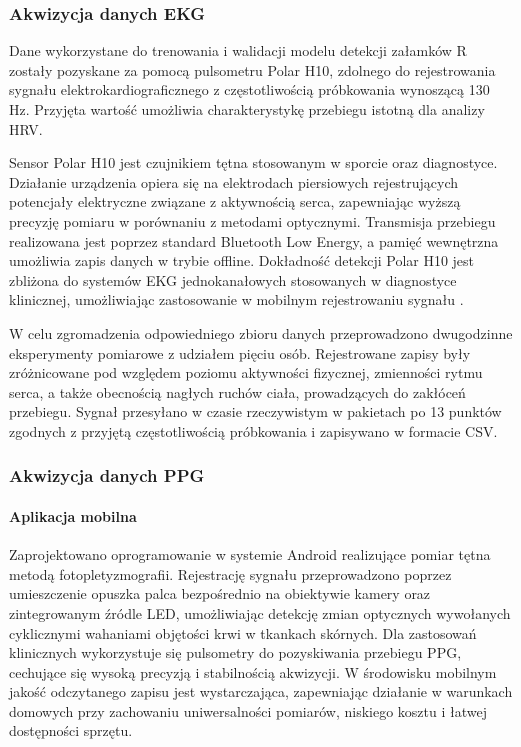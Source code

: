\documentclass[journal]{IEEEtran}
\begin{document}
\subsubsection{Akwizycja danych EKG}
Dane wykorzystane do trenowania i walidacji modelu detekcji załamków R zostały pozyskane za pomocą pulsometru Polar H10, zdolnego do rejestrowania sygnału elektrokardiograficznego z częstotliwością próbkowania wynoszącą 130 Hz. Przyjęta wartość umożliwia charakterystykę przebiegu istotną dla analizy HRV.

Sensor Polar H10 jest czujnikiem tętna stosowanym w sporcie oraz diagnostyce. Działanie urządzenia opiera się na elektrodach piersiowych rejestrujących potencjały elektryczne związane z aktywnością serca, zapewniając wyższą precyzję pomiaru w porównaniu z metodami optycznymi. Transmisja przebiegu realizowana jest poprzez standard Bluetooth Low Energy, a pamięć wewnętrzna umożliwia zapis danych w trybie offline. Dokładność detekcji Polar H10 jest zbliżona do systemów EKG jednokanałowych stosowanych w diagnostyce klinicznej, umożliwiając zastosowanie w mobilnym rejestrowaniu sygnału \cite{15}.

W celu zgromadzenia odpowiedniego zbioru danych przeprowadzono dwugodzinne eksperymenty pomiarowe z udziałem pięciu osób. Rejestrowane zapisy były zróżnicowane pod względem poziomu aktywności fizycznej, zmienności rytmu serca, a także obecnością nagłych ruchów ciała, prowadzących do zakłóceń przebiegu. Sygnał przesyłano w czasie rzeczywistym w pakietach po 13 punktów zgodnych z przyjętą częstotliwością próbkowania i zapisywano w formacie CSV. 


\subsubsection{Akwizycja danych PPG}
\paragraph{Aplikacja mobilna}
Zaprojektowano oprogramowanie w systemie Android realizujące pomiar tętna metodą fotopletyzmografii. Rejestrację sygnału przeprowadzono poprzez umieszczenie opuszka palca bezpośrednio na obiektywie kamery oraz zintegrowanym źródle LED, umożliwiając detekcję zmian optycznych wywołanych cyklicznymi wahaniami objętości krwi w tkankach skórnych. Dla zastosowań klinicznych wykorzystuje się pulsometry do pozyskiwania przebiegu PPG, cechujące się wysoką precyzją i stabilnością akwizycji. W środowisku mobilnym jakość odczytanego zapisu jest wystarczająca, zapewniając działanie w warunkach domowych przy zachowaniu uniwersalności pomiarów, niskiego kosztu i łatwej dostępności sprzętu.
\end{document}
